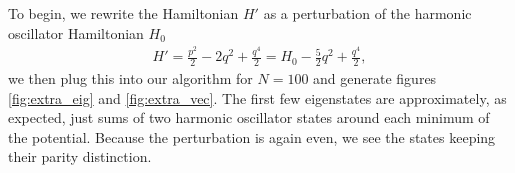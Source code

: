 \documentclass[10pt,a4paper,twocolumn]{article}
\begin{document}
To begin, we rewrite the Hamiltonian $H'$ as a perturbation of the harmonic oscillator Hamiltonian $H_0$
%
\begin{align}
H' = \frac{p^2}{2} - 2q^2 + \frac{q^4}{2} = H_0 - \frac{5}{2}q^2 + \frac{q^4}{2},
\end{align}
%
we then plug this into our algorithm for $N = 100$ and generate figures \ref{fig:extra_eig} and \ref{fig:extra_vec}. The first few eigenstates are approximately, as expected, just sums of two harmonic oscillator states around each minimum of the potential. Because the perturbation is again even, we see the states keeping their parity distinction.

\printbibliography
\end{document}
